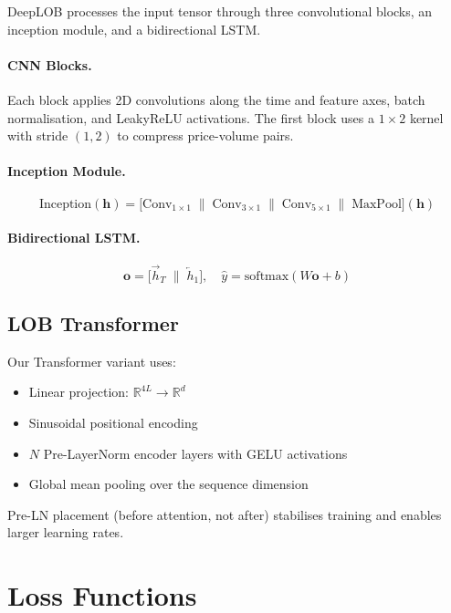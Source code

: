 \documentclass[11pt,a4paper]{article}
\begin{document}
DeepLOB \citep{zhang2019deeplob} processes the input tensor through three
convolutional blocks, an inception module, and a bidirectional LSTM.

\paragraph{CNN Blocks.}
Each block applies 2D convolutions along the time and feature axes,
batch normalisation, and LeakyReLU activations.  The first block uses a
$1\!\times\!2$ kernel with stride $(1,2)$ to compress price-volume pairs.

\paragraph{Inception Module.}
\[
  \text{Inception}(\mathbf{h}) =
    \bigl[\text{Conv}_{1\times1} \;\|\;
           \text{Conv}_{3\times1} \;\|\;
           \text{Conv}_{5\times1} \;\|\;
           \text{MaxPool}\bigr](\mathbf{h})
\]

\paragraph{Bidirectional LSTM.}
\[
  \mathbf{o} = \bigl[\overrightarrow{h}_T \;\|\; \overleftarrow{h}_1\bigr],
  \quad \hat{y} = \text{softmax}(W\mathbf{o} + b)
\]

\subsection{LOB Transformer}

Our Transformer variant uses:
\begin{itemize}
  \item Linear projection: $\mathbb{R}^{4L} \to \mathbb{R}^{d}$
  \item Sinusoidal positional encoding
  \item $N$ Pre-LayerNorm encoder layers with GELU activations
  \item Global mean pooling over the sequence dimension
\end{itemize}

Pre-LN placement (before attention, not after) stabilises training and
enables larger learning rates.

\section{Loss Functions}
\label{sec:loss}
\end{document}

